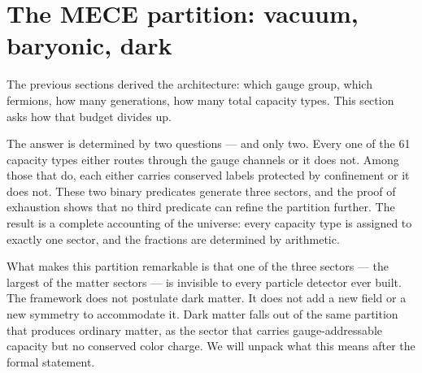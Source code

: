 \documentclass[11pt]{article}
\begin{document}
\section{The MECE partition: vacuum, baryonic, dark}
\label{sec:partition}

The previous sections derived the architecture: which gauge group, which fermions, how many generations, how many total capacity types.  This section asks how that budget divides up.

The answer is determined by two questions --- and only two.  Every one of the 61 capacity types either routes through the gauge channels or it does not.  Among those that do, each either carries conserved labels protected by confinement or it does not.  These two binary predicates generate three sectors, and the proof of exhaustion shows that no third predicate can refine the partition further.  The result is a complete accounting of the universe: every capacity type is assigned to exactly one sector, and the fractions are determined by arithmetic.

What makes this partition remarkable is that one of the three sectors --- the largest of the matter sectors --- is invisible to every particle detector ever built.  The framework does not postulate dark matter.  It does not add a new field or a new symmetry to accommodate it.  Dark matter falls out of the same partition that produces ordinary matter, as the sector that carries gauge-addressable capacity but no conserved color charge.  We will unpack what this means after the formal statement.
\end{document}
